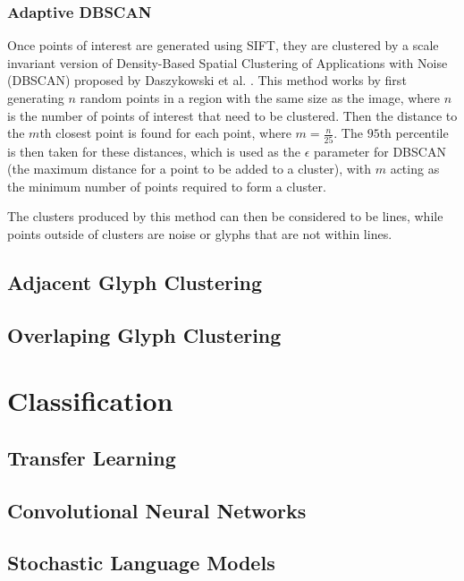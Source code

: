\subsubsection{Adaptive DBSCAN}

Once points of interest are generated using SIFT, they are clustered by a scale invariant version of Density-Based Spatial Clustering of Applications with Noise (DBSCAN) \cite{Ester} proposed by Daszykowski et al. \cite{Daszykowski}. This method works by first generating $n$ random points in a region with the same size as the image, where $n$ is the number of points of interest that need to be clustered. Then the distance to the $m$th closest point is found for each point, where $m = \frac{n}{25}$. The $95$th percentile is then taken for these distances, which is used as the $\epsilon$ parameter for DBSCAN (the maximum distance for a point to be added to a cluster), with $m$ acting as the minimum number of points required to form a cluster.

The clusters produced by this method can then be considered to be lines, while points outside of clusters are noise or glyphs that are not within lines.

\subsection{Adjacent Glyph Clustering}

\subsection{Overlaping Glyph Clustering}


\section{Classification}

\subsection{Transfer Learning}

\subsection{Convolutional Neural Networks}

\subsection{Stochastic Language Models}

